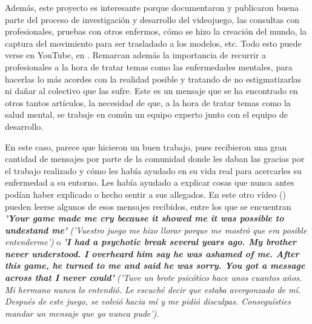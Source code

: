 \documentclass[12pt, a4paper,twoside,titlepage]{book}
\begin{document}
Además, este proyecto es interesante porque documentaron y publicaron buena parte del proceso de investigación y desarrollo del videojuego, las consultas con profesionales, pruebas con otros enfermos, cómo se hizo la creación del mundo, la captura del movimiento para ser trasladado a los modelos, etc. Todo esto puede verse en YouTube, en . Remarcan además la importancia de recurrir a profesionales a la hora de tratar temas como las enfermedades mentales, para hacerlas lo más acordes con la realidad posible y tratando de no estigmatizarlas ni dañar al colectivo que las sufre. Este es un mensaje que se ha encontrado en otros tantos artículos, la necesidad de que, a la hora de tratar temas como la salud mental, se trabaje en común un equipo experto junto con el equipo de desarrollo.

En este caso, parece que hicieron un buen trabajo, pues recibieron una gran cantidad de mensajes por parte de la comunidad donde les daban las gracias por el trabajo realizado y cómo les había ayudado en su vida real para acercarles su enfermedad a su entorno. Les había ayudado a explicar cosas que nunca antes podían haber explicado o hecho sentir a sus allegados. En este otro vídeo () pueden leerse algunos de esos mensajes recibidos, entre los que se encuentran \textbf{\textit{'Your game made me cry because it showed me it was possible to undestand me'}} \textit{('Vuestro juego me hizo llorar porque me mostró que era posible entenderme')} o \textbf{\textit{'I had a psychotic break several years ago. My brother never understood. I overheard him say he was ashamed of me. After this game, he turned to me and said he was sorry. You got a message across that I never could'}} \textit{('Tuve un brote psicótico hace unos cuantos años. Mi hermano nunca lo entendió. Le escuché decir que estaba avergonzado de mí. Después de este juego, se volvió hacia mí y me pidió disculpas. Conseguísties mandar un mensaje que yo nunca pude')}. 
\end{document}
